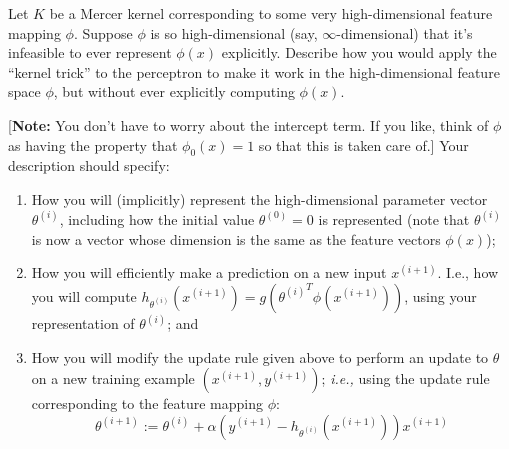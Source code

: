 \item {} Let $K$ be a Mercer kernel corresponding to some
very high-dimensional feature
mapping $\phi$. Suppose $\phi$ is so high-dimensional (say,
$\infty$-dimensional) that it's infeasible to ever represent $\phi(x)$
explicitly.  Describe how you would apply the ``kernel trick'' to the
perceptron to make it work in the high-dimensional feature space $\phi$, but
without ever explicitly computing $\phi(x)$.

[\textbf{Note:} You don't have to worry about the intercept term.  If you like,
think of $\phi$ as having the property that $\phi_0(x) = 1$ so that this is
taken care of.] Your description should specify:
\begin{enumerate}[label=\roman*.]
  \item {} How you will (implicitly) represent the
  high-dimensional
    parameter vector $\theta^{(i)}$, including how the initial value
    $\theta^{(0)} = 0$ is represented (note that $\theta^{(i)}$ is
    now a vector whose dimension is the same as the feature vectors
    $\phi(x)$);
  \item {} How you will efficiently make a prediction on a
  new input
    $x^{(i+1)}$.  I.e., how you will compute
    $h_{\theta^{(i)}}(x^{(i+1)}) = g({\theta^{(i)}}^T \phi(x^{(i+1)}))$,
    using your representation of $\theta^{(i)}$; and
  \item {} How you will modify the update rule given above
  to perform an
  update to $\theta$ on a new training example $(x^{(i+1)}, y^{(i+1)})$;
  \emph{i.e.,} using the update rule corresponding to the feature mapping
  $\phi$:
  \begin{equation*}
  \theta^{(i+1)} :=
	  \theta^{(i)} + \alpha (y^{(i+1)} - h_{\theta^{(i)}}(x^{(i+1)})) x^{(i+1)}
  \end{equation*}
\end{enumerate}

\ifnum{} {
  
} \fi

